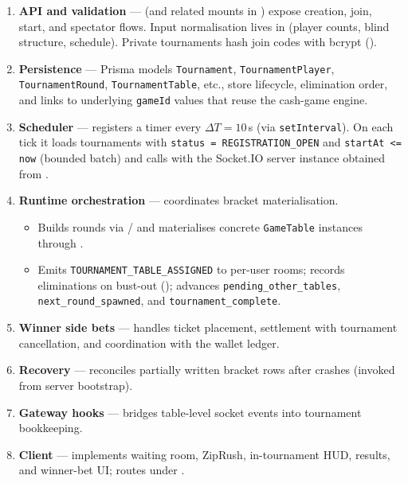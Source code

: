 \documentclass[11pt,a4paper]{article}
\begin{document}
{\small
\begin{enumerate}
\item \textbf{API and validation} ---  (and related mounts in ) expose creation, join, start, and spectator flows. Input normalisation lives in  (player counts, blind structure, schedule). Private tournaments hash join codes with bcrypt ().
\item \textbf{Persistence} --- Prisma models \texttt{Tournament}, \texttt{TournamentPlayer}, \texttt{TournamentRound}, \texttt{TournamentTable}, etc., store lifecycle, elimination order, and links to underlying \texttt{gameId} values that reuse the cash-game engine.
\item \textbf{Scheduler} ---  registers a timer every $\Delta T = 10$\,s (via \texttt{setInterval}). On each tick it loads tournaments with \texttt{status = REGISTRATION\_OPEN} and \texttt{startAt <= now} (bounded batch) and calls  with the Socket.IO server instance obtained from .
\item \textbf{Runtime orchestration} ---  coordinates bracket materialisation.
  \begin{itemize}
  \item Builds rounds via  /  and materialises concrete \texttt{GameTable} instances through .
  \item Emits \texttt{TOURNAMENT\_TABLE\_ASSIGNED} to per-user rooms; records eliminations on bust-out (); advances \texttt{pending\_other\_tables}, \texttt{next\_round\_spawned}, and \texttt{tournament\_complete}.
  \end{itemize}
\item \textbf{Winner side bets} ---  handles ticket placement, settlement with tournament cancellation, and coordination with the wallet ledger.
\item \textbf{Recovery} ---  reconciles partially written bracket rows after crashes (invoked from server bootstrap).
\item \textbf{Gateway hooks} ---  bridges table-level socket events into tournament bookkeeping.
\item \textbf{Client} ---  implements waiting room, ZipRush, in-tournament HUD, results, and winner-bet UI; routes under .
\end{enumerate}
}
\end{document}
